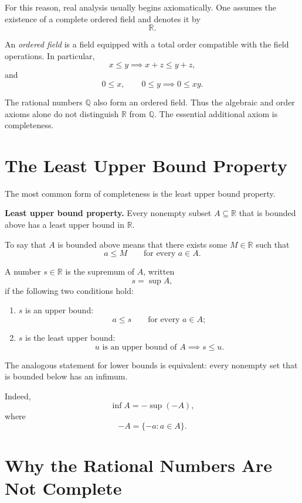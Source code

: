 \documentclass{essay}
\begin{document}
For this reason, real analysis usually begins axiomatically. One assumes the existence of a complete ordered field and denotes it by
\[ \mathbb{R}. \]

An \emph{ordered field} is a field equipped with a total order compatible with the field operations. In particular,
\[ x \leq y \implies x+z \leq y+z, \]
and
\[ 0\leq x,\qquad 0\leq y \implies 0\leq xy. \]

The rational numbers \(\mathbb{Q}\) also form an ordered field. Thus the algebraic and order axioms alone do not distinguish \(\mathbb{R}\) from \(\mathbb{Q}\). The essential additional axiom is completeness.

\section{The Least Upper Bound Property}

The most common form of completeness is the least upper bound property.

\medskip

\noindent
\textbf{Least upper bound property.}
Every nonempty subset \(A\subseteq\mathbb{R}\) that is bounded above has a least upper bound in \(\mathbb{R}\).

\medskip

To say that \(A\) is bounded above means that there exists some \(M\in\mathbb{R}\) such that
\[ a\leq M \qquad \text{for every } a\in A. \]

A number \(s\in\mathbb{R}\) is the supremum of \(A\), written
\[ s=\sup A, \]
if the following two conditions hold:

\begin{enumerate}
  \item \(s\) is an upper bound:
    \[ a\leq s \qquad \text{for every } a\in A; \]

  \item \(s\) is the least upper bound:
    \[ u \text{ is an upper bound of } A \implies s\leq u. \]
\end{enumerate}

The analogous statement for lower bounds is equivalent: every nonempty set that is bounded below has an infimum.

Indeed,
\[ \inf A = -\sup(-A), \]
where
\[ -A=\{-a:a\in A\}. \]

\section{Why the Rational Numbers Are Not Complete}
\end{document}
